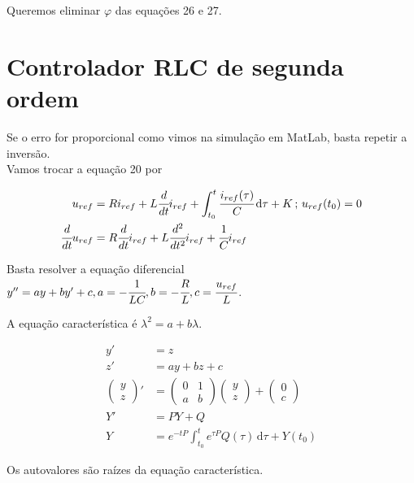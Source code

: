 \documentclass[12pt]{article}
\begin{document}
Queremos eliminar $\varphi$ das equa\c{c}\~oes 26 e 27.

\section{Controlador RLC de segunda ordem}

\begin{flushleft}
Se o erro for proporcional como vimos na simula\c{c}\~ao em MatLab, basta repetir a invers\~ao. \\
Vamos trocar a equa\c{c}\~ao 20 por
\end{flushleft}

\begin{align}
 u_{ref} &= R i_{ref} + L \cfrac{d}{dt} i_{ref} + \int_{t_0}^t \cfrac{i_{ref}(\tau)}{C}\, \mathrm{d}\tau + K\,;\,u_{ref}(t_0) = 0 \\
  \cfrac{d}{dt} u_{ref} &= R \cfrac{d}{dt} i_{ref} + L \cfrac{d^2}{dt^2} i_{ref} + \cfrac{1}{C}i_{ref}
\end{align}

Basta resolver a equa\c{c}\~ao diferencial $y'' = a y + b y' + c, a = -\cfrac{1}{LC}, b = - \cfrac{R}{L}, c = \cfrac{u_{ref}}{L}$.

A equa\c{c}\~ao caracter\'istica \'e $\lambda^2 = a + b\lambda$.

\begin{align}
 y' &= z \\
 z' &= ay + bz + c \\
 \begin{pmatrix} y \\ z \end{pmatrix}' &= \begin{pmatrix} 0 & 1 \\ a & b \end{pmatrix}\begin{pmatrix} y \\ z \end{pmatrix} + \begin{pmatrix} 0 \\ c \end{pmatrix} \\
 Y' &= P Y + Q \\
 Y &= e^{-tP} \int_{t_0}^t e^{\tau P} Q(\tau)\, \mathrm{d}\tau + Y(t_0)
\end{align}

Os autovalores s\~ao ra\'izes da equa\c{c}\~ao caracter\'istica.
\end{document}
